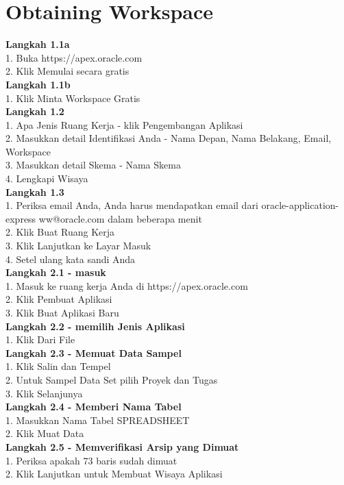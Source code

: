 \documentclass[12pt, times new roman, a4paper]{article}
\begin{document}
\section{Obtaining Workspace}
\textbf{Langkah 1.1a}\\
1. Buka https://apex.oracle.com \\
2. Klik Memulai secara gratis\\
\textbf{Langkah 1.1b}\\
1. Klik Minta Workspace Gratis\\
\textbf{Langkah 1.2}\\
1. Apa Jenis Ruang Kerja - klik Pengembangan Aplikasi \\
2. Masukkan detail Identifikasi Anda - Nama Depan, Nama Belakang, Email, Workspace\\
3. Masukkan detail Skema - Nama Skema \\
4. Lengkapi Wisaya \\
\textbf{Langkah 1.3}\\
1. Periksa email Anda, Anda harus mendapatkan email dari oracle-application-express ww@oracle.com dalam beberapa menit \\
2. Klik Buat Ruang Kerja \\
3. Klik Lanjutkan ke Layar Masuk \\
4. Setel ulang kata sandi Anda \\
\textbf{Langkah 2.1 - masuk}\\
1. Masuk ke ruang kerja Anda di https://apex.oracle.com \\
2. Klik Pembuat Aplikasi \\
3. Klik Buat Aplikasi Baru \\
\textbf{Langkah 2.2 - memilih Jenis Aplikasi}\\
1. Klik Dari File \\
\textbf{Langkah 2.3 - Memuat Data Sampel}\\
1. Klik Salin dan Tempel \\
2. Untuk Sampel Data Set pilih Proyek dan Tugas \\
3. Klik Selanjunya\\
\textbf{Langkah 2.4 - Memberi Nama Tabel}\\
1. Masukkan Nama Tabel {SPREADSHEET} \\
2. Klik Muat Data \\
\textbf{Langkah 2.5 - Memverifikasi Arsip yang Dimuat}\\
1. Periksa apakah 73 baris sudah dimuat \\
2. Klik Lanjutkan untuk Membuat Wisaya Aplikasi \\
\end{document}
